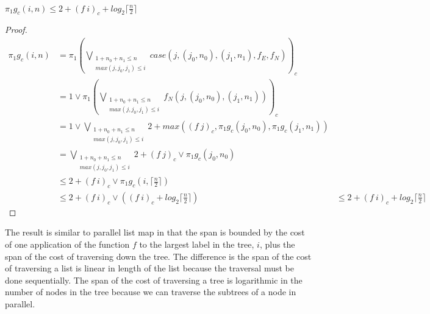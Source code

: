 \paragraph{}
%
\begin{lemma}
	$\pi_1 g_c(i,n) \leq 2 + (f\ i)_c + log_2 \lceil \frac{n}{2} \rceil$
\end{lemma}
%
\begin{proof}
\begin{align*}
    \pi_1 g_c(i,n) &= \pi_1 (\bigvee\limits_{\substack{1 + n_0 + n_1 \leq n \\ max(j,j_0,j_1) \leq i}} case(j,(j_0,n_0),(j_1,n_1), f_E, f_N))_c \\
                  &= 1 \vee \pi_1 (\bigvee\limits_{\substack{1 + n_0 + n_1 \leq n \\ max(j,j_0,j_1) \leq i}} f_N(j,(j_0,n_0),(j_1,n_1)))_c \\
                  &= 1 \vee \bigvee\limits_{\substack{1 + n_0 + n_1 \leq n \\ max(j,j_0,j_1) \leq i}} 2 + max((f\ j)_c,\pi_1 g_c(j_0,n_0),\pi_1 g_c(j_1,n_1)) \\
                  &= \bigvee\limits_{\substack{1 + n_0 + n_1 \leq n \\ max(j,j_0,j_1) \leq i}} 2 + (f\ j)_c \vee \pi_1 g_c(j_0,n_0) \\
                  &\leq 2 + (f\ i)_c \vee \pi_1 g_c(i,\lceil \frac{n}{2} \rceil) \\
									&\leq 2 + (f\ i)_c \vee ((f\ i)_c + log_2 \lceil \frac{n}{2} \rceil)
									&\leq 2 + (f\ i)_c + log_2 \lceil \frac{n}{2} \rceil
\end{align*}
\end{proof}
%
The result is similar to parallel list map in that the span is bounded by the
cost of one application of the function $f$ to the largest label in the tree,
$i$, plus the span of the cost of traversing down the tree. The difference is
the span of the cost of traversing a list is linear in length of the list
because the traversal must be done sequentially. The span of the cost of
traversing a tree is logarithmic in the number of nodes in the tree because we
can traverse the subtrees of a node in parallel.



